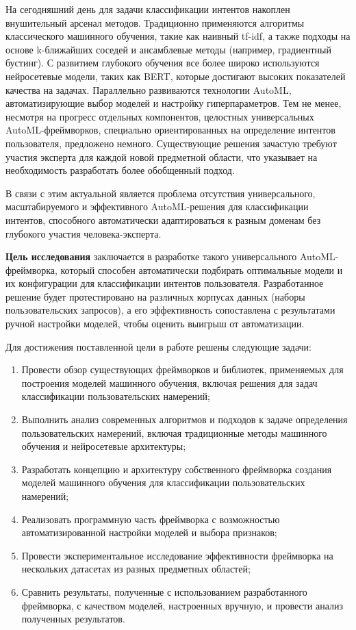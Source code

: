 \documentclass[14pt,a4paper,oneside,openany]{extbook}
\begin{document}
На сегодняшний день для задачи классификации интентов накоплен внушительный арсенал методов. Традиционно применяются алгоритмы классического машинного обучения, такие как наивный tf-idf\autocite{joneskarensparck_statistical_1972}, а также подходы на основе k-ближайших соседей и ансамблевые методы (например, градиентный бустинг). С развитием глубокого обучения все более широко используются нейросетевые модели, таких как BERT\autocite{devlin_bert_2019}, которые достигают высоких показателей качества на задачах. Параллельно развиваются технологии AutoML, автоматизирующие выбор моделей и настройку гиперпараметров. Тем не менее, несмотря на прогресс отдельных компонентов, целостных универсальных AutoML-фреймворков, специально ориентированных на определение интентов пользователя, предложено немного. Существующие решения зачастую требуют участия эксперта для каждой новой предметной области, что указывает на необходимость разработать более обобщенный подход.

В связи с этим актуальной является проблема отсутствия универсального, масштабируемого и эффективного AutoML-решения для классификации интентов, способного автоматически адаптироваться к разным доменам без глубокого участия человека-эксперта.

\textbf{Цель исследования} заключается в разработке такого универсального AutoML-фреймворка, который способен автоматически подбирать оптимальные модели и их конфигурации для классификации интентов пользователя. Разработанное решение будет протестировано на различных корпусах данных (наборы пользовательских запросов), а его эффективность сопоставлена с результатами ручной настройки моделей, чтобы оценить выигрыш от автоматизации.

Для достижения поставленной цели в работе решены следующие задачи:
\begin{enumerate}
\item Провести обзор существующих фреймворков и библиотек, применяемых для построения моделей машинного обучения, включая решения для задач классификации пользовательских намерений;
\item Выполнить анализ современных алгоритмов и подходов к задаче определения пользовательских намерений, включая традиционные методы машинного обучения и нейросетевые архитектуры;
\item Разработать концепцию и архитектуру собственного фреймворка создания моделей машинного обучения для классификации пользовательских намерений;
\item Реализовать программную часть фреймворка с возможностью автоматизированной настройки моделей и выбора признаков;
\item Провести экспериментальное исследование эффективности фреймворка на нескольких датасетах из разных предметных областей;
\item Сравнить результаты, полученные с использованием разработанного фреймворка, с качеством моделей, настроенных вручную, и провести анализ полученных результатов.
\end{enumerate}
\end{document}
